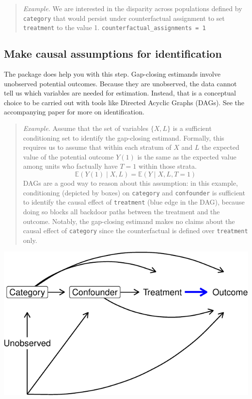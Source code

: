 \documentclass[
]{article}
\begin{document}
\begin{quote}
\emph{Example.} We are interested in the disparity across populations defined by \texttt{category} that would persist under counterfactual assignment to set \texttt{treatment} to the value 1.
\texttt{counterfactual\_assignments\ =\ 1}
\end{quote}

\hypertarget{make-causal-assumptions-for-identification}{%
\subsection{Make causal assumptions for identification}\label{make-causal-assumptions-for-identification}}

The package does help you with this step. Gap-closing estimands involve unobserved potential outcomes. Because they are unobserved, the data cannot tell us which variables are needed for estimation. Instead, that is a conceptual choice to be carried out with tools like Directed Acyclic Graphs (DAGs). See the accompanying \citet{lundberg2021} paper for more on identification.

\begin{quote}
\emph{Example.} Assume that the set of variables \(\{X,L\}\) is a sufficient conditioning set to identify the gap-closing estimand. Formally, this requires us to assume that within each stratum of \(X\) and \(L\) the expected value of the potential outcome \(Y(1)\) is the same as the expected value among units who factually have \(T = 1\) within those strata.
\[\mathbb{E}(Y(1)\mid X, L) = \mathbb{E}(Y\mid X, L, T = 1)\]
DAGs are a good way to reason about this assumption: in this example, conditioning (depicted by boxes) on \texttt{category} and \texttt{confounder} is sufficient to identify the causal effect of \texttt{treatment} (blue edge in the DAG), because doing so blocks all backdoor paths between the treatment and the outcome. Notably, the gap-closing estimand makes no claims about the causal effect of \texttt{category} since the counterfactual is defined over \texttt{treatment} only.
\end{quote}

\includegraphics{github_doc_files/figure-latex/unnamed-chunk-18-1.pdf}
\end{document}
